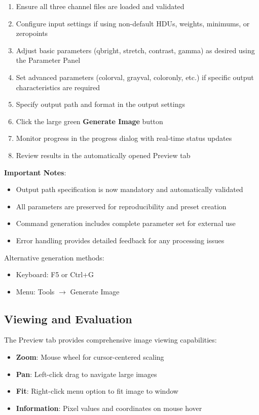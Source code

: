 \documentclass[11pt,a4paper]{article}
\begin{document}
\begin{enumerate}
\item Ensure all three channel files are loaded and validated
\item Configure input settings if using non-default HDUs, weights, 
minimums, or zeropoints
\item Adjust basic parameters (qbright, stretch, contrast, gamma) as 
desired using the Parameter Panel
\item Set advanced parameters (colorval, grayval, coloronly, etc.) if 
specific output characteristics are required
\item Specify output path and format in the output settings
\item Click the large green \textbf{Generate Image} button
\item Monitor progress in the progress dialog with real-time status updates
\item Review results in the automatically opened Preview tab
\end{enumerate}

\textbf{Important Notes}:
\begin{itemize}[leftmargin=*]
\item Output path specification is now mandatory and automatically validated
\item All parameters are preserved for reproducibility and preset creation
\item Command generation includes complete parameter set for external use
\item Error handling provides detailed feedback for any processing issues
\end{itemize}

Alternative generation methods:
\begin{itemize}[leftmargin=*]
\item Keyboard: F5 or Ctrl+G
\item Menu: Tools $\rightarrow$ Generate Image
\end{itemize}

\subsection{Viewing and Evaluation}

The Preview tab provides comprehensive image viewing capabilities:

\begin{itemize}[leftmargin=*]
\item \textbf{Zoom}: Mouse wheel for cursor-centered scaling
\item \textbf{Pan}: Left-click drag to navigate large images
\item \textbf{Fit}: Right-click menu option to fit image to window
\item \textbf{Information}: Pixel values and coordinates on mouse hover
\end{itemize}
\end{document}
